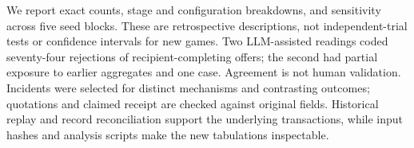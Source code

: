 We report exact counts, stage and configuration breakdowns, and sensitivity across five seed blocks. These are retrospective descriptions, not independent-trial tests or confidence intervals for new games. Two LLM-assisted readings coded seventy-four rejections of recipient-completing offers; the second had partial exposure to earlier aggregates and one case. Agreement is not human validation. Incidents were selected for distinct mechanisms and contrasting outcomes; quotations and claimed receipt are checked against original fields. Historical replay and record reconciliation support the underlying transactions, while input hashes and analysis scripts make the new tabulations inspectable.
